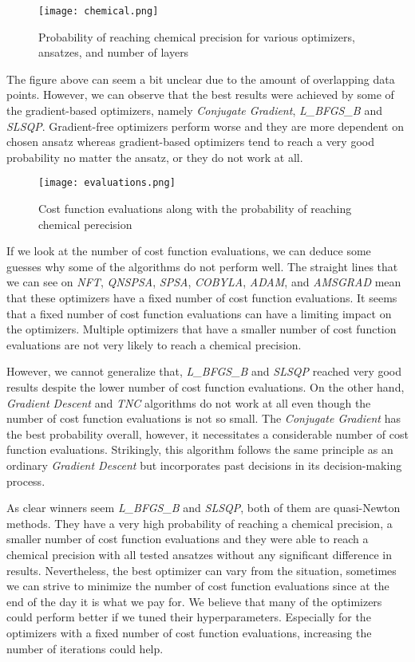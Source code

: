 \begin{figure}
    \centering
    \texttt{[image: chemical.png]}
    \caption{Probability of reaching chemical precision for various optimizers, ansatzes, and number of layers}
    \label{fig:chemical}
\end{figure}

The figure above can seem a bit unclear due to the amount of overlapping data points. However, we can observe that the best results were achieved by some of the gradient-based optimizers, namely \textit{Conjugate Gradient}, \textit{L\_BFGS\_B} and \textit{SLSQP}. Gradient-free optimizers perform worse and they are more dependent on chosen ansatz whereas gradient-based optimizers tend to reach a very good probability no matter the ansatz, or they do not work at all. 

\begin{figure}
    \centering
    \texttt{[image: evaluations.png]}
    \caption{Cost function evaluations along with the probability of reaching chemical perecision}
    \label{fig:evaluations}
\end{figure}

If we look at the number of cost function evaluations, we can deduce some guesses why some of the algorithms do not perform well. The straight lines that we can see on \textit{NFT}, \textit{QNSPSA}, \textit{SPSA}, \textit{COBYLA}, \textit{ADAM}, and \textit{AMSGRAD} mean that these optimizers have a fixed number of cost function evaluations. It seems that a fixed number of cost function evaluations can have a limiting impact on the optimizers. Multiple optimizers that have a smaller number of cost function evaluations are not very likely to reach a chemical precision.

However, we cannot generalize that, \textit{L\_BFGS\_B} and \textit{SLSQP} reached very good results despite the lower number of cost function evaluations. On the other hand, \textit{Gradient Descent} and \textit{TNC} algorithms do not work at all even though the number of cost function evaluations is not so small. The \textit{Conjugate Gradient} has the best probability overall, however, it necessitates a considerable number of cost function evaluations. Strikingly, this algorithm follows the same principle as an ordinary \textit{Gradient Descent} but incorporates past decisions in its decision-making process.

As clear winners seem \textit{L\_BFGS\_B} and \textit{SLSQP}, both of them are quasi-Newton methods. They have a very high probability of reaching a chemical precision, a smaller number of cost function evaluations and they were able to reach a chemical precision with all tested ansatzes without any significant difference in results. Nevertheless, the best optimizer can vary from the situation, sometimes we can strive to minimize the number of cost function evaluations since at the end of the day it is what we pay for. We believe that many of the optimizers could perform better if we tuned their hyperparameters. Especially for the optimizers with a fixed number of cost function evaluations, increasing the number of iterations could help.
